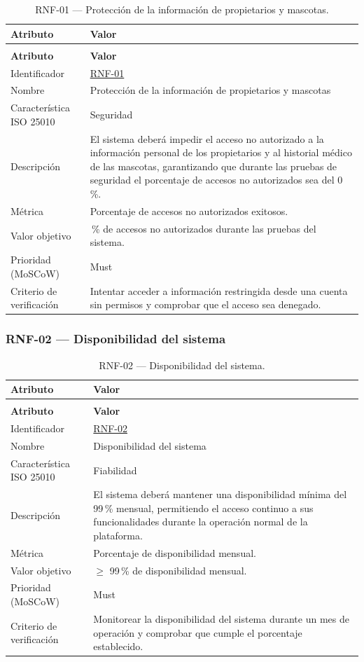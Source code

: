 \documentclass[journal,onecolumn]{IEEEtran}
\makeatletter
\newenvironment{atributos}[2]{%
	\small
	\begin{longtable}{@{}>{\raggedright\arraybackslash}p{4.2cm} >{\raggedright\arraybackslash}p{11.2cm}@{}}
		\caption{#2}\label{tab:#1}\\
		\toprule
		\textbf{Atributo} & \textbf{Valor} \\
		\midrule
		\endfirsthead
		\multicolumn{2}{@{}l}{\small\itshape (continuación)}\\
		\toprule
		\textbf{Atributo} & \textbf{Valor} \\
		\midrule
		\endhead
		\bottomrule
		\endlastfoot
	}{%
	\end{longtable}
	\normalsize
}
\makeatother
\begin{document}
	\begin{atributos}{RNF-01}{RNF-01 --- Protección de la información de propietarios y mascotas.}
		Identificador & \hyperref[tab:RNF-01]{RNF-01} \\
		Nombre & Protección de la información de propietarios y mascotas \\
		Característica ISO 25010 & Seguridad \\
		Descripción & El sistema deberá impedir el acceso no autorizado a la información personal de los propietarios y al historial médico de las mascotas, garantizando que durante las pruebas de seguridad el porcentaje de accesos no autorizados sea del 0\,\%. \\
		Métrica & Porcentaje de accesos no autorizados exitosos. \\
		Valor objetivo & 0\,\% de accesos no autorizados durante las pruebas del sistema. \\
		Prioridad (MoSCoW) & Must \\
		Criterio de verificación & Intentar acceder a información restringida desde una cuenta sin permisos y comprobar que el acceso sea denegado. \\
	\end{atributos}
	
	\subsubsection{RNF-02 --- Disponibilidad del sistema}
	
	\begin{atributos}{RNF-02}{RNF-02 --- Disponibilidad del sistema.}
		Identificador & \hyperref[tab:RNF-02]{RNF-02} \\
		Nombre & Disponibilidad del sistema \\
		Característica ISO 25010 & Fiabilidad \\
		Descripción & El sistema deberá mantener una disponibilidad mínima del 99\,\% mensual, permitiendo el acceso continuo a sus funcionalidades durante la operación normal de la plataforma. \\
		Métrica & Porcentaje de disponibilidad mensual. \\
		Valor objetivo & $\geq$ 99\,\% de disponibilidad mensual. \\
		Prioridad (MoSCoW) & Must \\
		Criterio de verificación & Monitorear la disponibilidad del sistema durante un mes de operación y comprobar que cumple el porcentaje establecido. \\
	\end{atributos}
	
\end{document}
